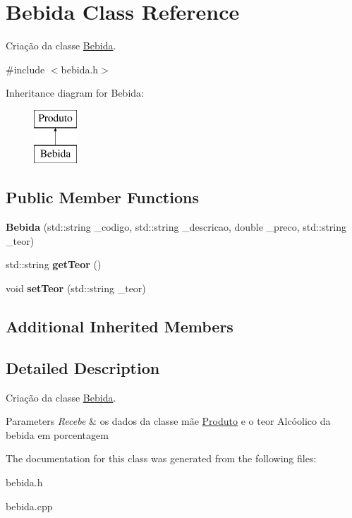 \hypertarget{classBebida}{}\section{Bebida Class Reference}
\label{classBebida}


Criação da classe \mbox{\hyperlink{classBebida}{Bebida}}.  




{\ttfamily \#include $<$bebida.\+h$>$}

Inheritance diagram for Bebida\+:\begin{figure}[H]
\begin{center}
\leavevmode
\includegraphics[height=2.000000cm]{classBebida}
\end{center}
\end{figure}
\subsection*{Public Member Functions}
\begin{DoxyCompactItemize}
\item 
\mbox{\label{classBebida_a0c588567354f736594b8ee019f8d6ef4}} 
{\bfseries Bebida} (std\+::string \+\_\+codigo, std\+::string \+\_\+descricao, double \+\_\+preco, std\+::string \+\_\+teor)
\item 
\mbox{\label{classBebida_ab24fcefd6e302a7fa61dc983472a3c83}} 
std\+::string {\bfseries get\+Teor} ()
\item 
\mbox{\label{classBebida_a83400736aec54ffc0345cbbf260a157d}} 
void {\bfseries set\+Teor} (std\+::string \+\_\+teor)
\end{DoxyCompactItemize}
\subsection*{Additional Inherited Members}


\subsection{Detailed Description}
Criação da classe \mbox{\hyperlink{classBebida}{Bebida}}. 


\begin{DoxyParams}{Parameters}
{\em Recebe} & os dados da classe mãe \mbox{\hyperlink{classProduto}{Produto}} e o teor Alcóolico da bebida em porcentagem \\
\hline
\end{DoxyParams}


The documentation for this class was generated from the following files\+:\begin{DoxyCompactItemize}
\item 
bebida.\+h\item 
bebida.\+cpp\end{DoxyCompactItemize}
